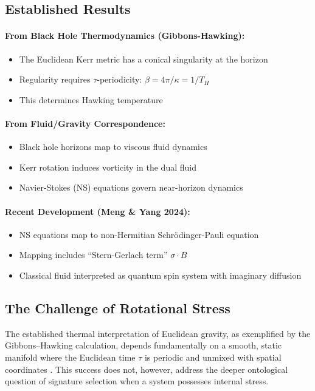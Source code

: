 \documentclass[11pt]{article}
\begin{document}
\subsection{Established Results}

\paragraph{From Black Hole Thermodynamics (Gibbons-Hawking\cite{GibbonsHawking1977}):}
\begin{itemize}
\item The Euclidean Kerr metric\cite{Kerr1963} has a conical singularity at the horizon
\item Regularity requires $\tau$-periodicity: $\beta = 4\pi/\kappa = 1/T_H$
\item This determines Hawking temperature
\end{itemize}

\paragraph{From Fluid/Gravity Correspondence\cite{FluidGravity2008}:}
\begin{itemize}
\item Black hole horizons map to viscous fluid dynamics
\item Kerr rotation induces vorticity in the dual fluid
\item Navier-Stokes\cite{NavierStokesMillennium} (NS) equations govern near-horizon dynamics
\end{itemize}

\paragraph{Recent Development (Meng \& Yang 2024):}
\begin{itemize}
\item NS equations map to non-Hermitian Schrödinger-Pauli equation
\item Mapping includes ``Stern-Gerlach\cite{SternGerlach1922} term'' $\sigma \cdot B$
\item Classical fluid interpreted as quantum spin system with imaginary diffusion
\end{itemize}
\subsection{The Challenge of Rotational Stress}

The established thermal interpretation of Euclidean gravity, as exemplified by the Gibbons--Hawking calculation, depends fundamentally on a smooth, static manifold where the Euclidean time $\tau$ is periodic and unmixed with spatial coordinates \cite{GibbonsHawking1977}. This success does not, however, address the deeper ontological question of signature selection when a system possesses internal stress.
\end{document}
